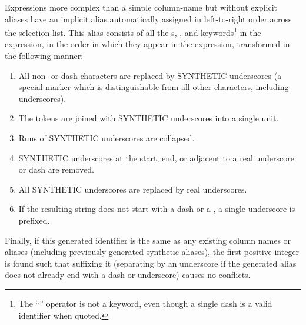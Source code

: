 \documentclass{article}
\begin{document}
Expressions more complex than a simple column-name but without
explicit aliases have an implicit alias automatically assigned in
left-to-right order across the selection list.  This alias consists of
all the s, , and keywords\footnote{The
  ``\code{-}'' operator is not a keyword, even though a single dash is
  a valid identifier when quoted.} in the expression, in the order in
which they appear in the expression, transformed in the following
manner:
\begin{enumerate}
\item All non--or-dash characters are
  replaced by SYNTHETIC underscores (a special marker which is
  distinguishable from all other characters, including underscores).
\item The tokens are joined with SYNTHETIC underscores into a single
  unit.
\item Runs of SYNTHETIC underscores are collapsed.
\item SYNTHETIC underscores at the start, end, or adjacent to a real
  underscore or dash are removed.
\item All SYNTHETIC underscores are replaced by real underscores.
\item If the resulting string does not start with a dash or a
  , a single underscore is prefixed.
\end{enumerate}
Finally, if this generated identifier is the same as any existing
column names or aliases (including previously generated synthetic
aliases), the first positive integer is found such that suffixing it
(separating by an underscore if the generated alias does not already
end with a dash or underscore) causes no conflicts.
\end{document}
